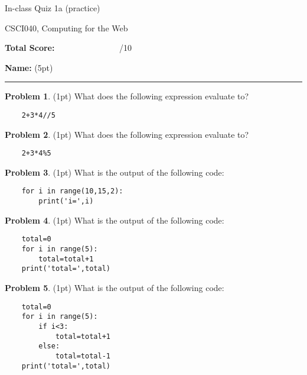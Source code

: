 \documentclass[10pt]{article}
\theoremstyle{definition}
\newtheorem{problem}{Problem}
\begin{document}
\begin{center}
    {
\Large
In-class Quiz 1a (practice)
}

    \vspace{0.1in}
CSCI040, Computing for the Web

    \vspace{0.1in}
\end{center}

\vspace{0.25in}
\noindent
\textbf{Total Score:} ~~~~~~~~~~~~~~~/10

\vspace{0.5in}
\noindent
\textbf{Name:} (5pt)

\noindent
\rule{\textwidth}{0.1pt}
\vspace{0.25in}

\begin{problem}
    (1pt)
    What does the following expression evaluate to?
\end{problem}
\begin{lstlisting}
    2+3*4//5
\end{lstlisting}
\vspace{1.5in}

\begin{problem}
    (1pt)
    What does the following expression evaluate to?
\end{problem}
\begin{lstlisting}
    2+3*4%5
\end{lstlisting}
\vspace{1.5in}

\begin{problem}
    (1pt)
    What is the output of the following code:
\end{problem}
\begin{lstlisting}
    for i in range(10,15,2):
        print('i=',i)
\end{lstlisting}
\vspace{2in}

\begin{problem}
    (1pt)
    What is the output of the following code:
\end{problem}
\begin{lstlisting}
    total=0
    for i in range(5):
        total=total+1
    print('total=',total)
\end{lstlisting}
\vspace{2in}

\begin{problem}
    (1pt)
    What is the output of the following code:
\end{problem}
\begin{lstlisting}
    total=0
    for i in range(5):
        if i<3:
            total=total+1
        else:
            total=total-1
    print('total=',total)
\end{lstlisting}
\end{document}
